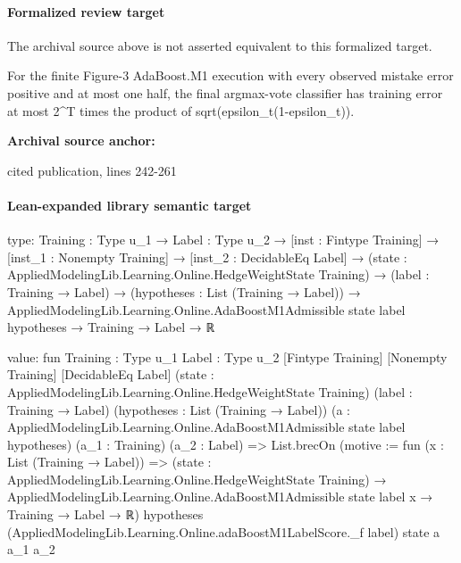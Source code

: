 \documentclass[10pt]{article}
\begin{document}
\paragraph{Formalized review target}
The archival source above is not asserted equivalent to this formalized target.
\begin{ReviewVerbatim}
For the finite Figure-3 AdaBoost.M1 execution with every observed mistake error positive and at most one half, the final argmax-vote classifier has training error at most 2^T times the product of sqrt(epsilon_t(1-epsilon_t)).
\end{ReviewVerbatim}

\textbf{Archival source anchor:} {\footnotesize\raggedright cited publication, lines 242-\allowbreak{}261\par}
\paragraph{Lean-expanded library semantic target}
\begin{ReviewVerbatim}
type:
{Training : Type u_1} →
  {Label : Type u_2} →
    [inst : Fintype Training] →
      [inst_1 : Nonempty Training] →
        [inst_2 : DecidableEq Label] →
          (state : AppliedModelingLib.Learning.Online.HedgeWeightState Training) →
            (label : Training → Label) →
              (hypotheses : List (Training → Label)) →
                AppliedModelingLib.Learning.Online.AdaBoostM1Admissible state label hypotheses → Training → Label → ℝ

value:
fun {Training : Type u_1} {Label : Type u_2} [Fintype Training] [Nonempty Training] [DecidableEq Label]
    (state : AppliedModelingLib.Learning.Online.HedgeWeightState Training) (label : Training → Label)
    (hypotheses : List (Training → Label))
    (a : AppliedModelingLib.Learning.Online.AdaBoostM1Admissible state label hypotheses) (a_1 : Training)
    (a_2 : Label) =>
  List.brecOn (motive := fun (x : List (Training → Label)) =>
    (state : AppliedModelingLib.Learning.Online.HedgeWeightState Training) →
      AppliedModelingLib.Learning.Online.AdaBoostM1Admissible state label x → Training → Label → ℝ)
    hypotheses (AppliedModelingLib.Learning.Online.adaBoostM1LabelScore._f label) state a a_1 a_2
\end{ReviewVerbatim}
\end{document}
